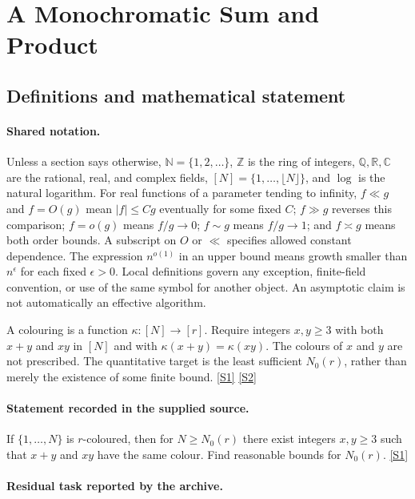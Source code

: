 \documentclass[11pt,a4paper]{article}
\newcommand{\N}{\mathbb{N}}
\newcommand{\Z}{\mathbb{Z}}
\newcommand{\Q}{\mathbb{Q}}
\newcommand{\R}{\mathbb{R}}
\newcommand{\C}{\mathbb{C}}
\newcommand{\sref}[2]{\hyperlink{source:#1:#2}{[S#2]}}
\begin{document}
\section{A Monochromatic Sum and Product}\label{statement}


\subsection{Definitions and mathematical statement}

\paragraph{Shared notation.}Unless a section says otherwise, $\N=\{1,2,\ldots\}$,
$\Z$ is the ring of integers, $\Q,\R,\C$ are the rational, real, and complex
fields, $[N]=\{1,\ldots,\lfloor N\rfloor\}$, and $\log$ is the natural
logarithm. For real functions of a parameter tending to infinity,
$f\ll g$ and $f=O(g)$ mean $|f|\leq Cg$ eventually for some fixed $C$;
$f\gg g$ reverses this comparison; $f=o(g)$ means $f/g\to0$;
$f\sim g$ means $f/g\to1$; and $f\asymp g$ means both order bounds.
A subscript on $O$ or $\ll$ specifies allowed constant dependence.
The expression $n^{o(1)}$ in an upper bound means growth smaller than
$n^\epsilon$ for each fixed $\epsilon>0$. Local definitions govern any
exception, finite-field convention, or use of the same symbol for another
object. An asymptotic claim is not automatically an effective algorithm.



A colouring is a function $\kappa:[N]\to[r]$. Require integers $x,y\geq3$ with both $x+y$ and $xy$ in $[N]$ and with $\kappa(x+y)=\kappa(xy)$. The colours of $x$ and $y$ are not prescribed. The quantitative target is the least sufficient $N_0(r)$, rather than merely the existence of some finite bound. \sref{statement}{1} \sref{statement}{2}

\paragraph{Statement recorded in the supplied source.}
If $\{1, \dots, N\}$ is $r$-coloured, then for $N \geq N_0(r)$ there exist integers $x, y \geq 3$ such that $x+y$ and $xy$ have the same colour. Find reasonable bounds for $N_0(r)$. \sref{statement}{1}

\paragraph{Residual task reported by the archive.}
\end{document}
